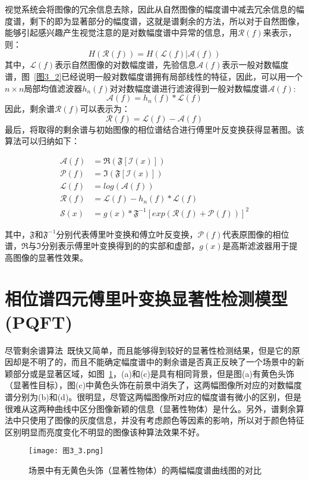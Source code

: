 视觉系统会将图像的冗余信息去除，因此从自然图像的幅度谱中减去冗余信息的幅度谱，剩下的即为显著部分的幅度谱，这就是谱剩余的方法，所以对于自然图像，能够引起感兴趣产生视觉注意的是对数幅度谱中异常的信息，用$\mathcal{R}(f)$来表示，则：
\begin{equation}
H(\mathcal{R}(f))=H(\mathcal{L}(f)|\mathcal{A}(f))
\label{式3_3}
\end{equation}
其中，$\mathcal{L}(f)$表示自然图像的对数幅度谱，先验信息$\mathcal{A}(f)$表示一般对数幅度谱，图~\ref{图3_2}已经说明一般对数幅度谱拥有局部线性的特征，因此，可以用一个$n \times n$局部均值滤波器${h}_{n}(f)$对对数幅度谱进行滤波得到一般对数幅度谱$\mathcal{A}(f)$:
\begin{equation}
\mathcal{A}(f)={h}_{n}(f)\ast \mathcal{L}(f)
\label{式3_4}
\end{equation}
因此，剩余谱$\mathcal{R}(f)$可以表示为：
\begin{equation}
\mathcal{R}(f)=\mathcal{L}(f)-\mathcal{A}(f)
\label{式3_5}
\end{equation}
最后，将取得的剩余谱与初始图像的相位谱结合进行傅里叶反变换获得显著图。该算法可以归纳如下：
\begin{linenomath}
\begin{align}
\mathcal{A}(f) &= \Re(\mathfrak{F}[\mathcal{I}(x)])\label{式3_6}\\
\mathcal{P}(f) &= \Im(\mathfrak{F}[\mathcal{I}(x)])\label{式3_7}\\
\mathcal{L}(f) &= log(\mathcal{A}(f))\label{式3_8}\\
\mathcal{R}(f) &= \mathcal{L}(f)-h_{n}(f)\ast \mathcal{L}(f) \label{式3_9}\\
\mathcal{S}(x) &= g(x)\ast \mathfrak{F}^{-1}[exp(\mathcal{R}(f)+\mathcal{P}(f))]^{2}\label{式3_10}
\end{align}
\end{linenomath}
其中，$\mathfrak{F}$和$\mathfrak{F}^{-1}$分别代表傅里叶变换和傅立叶反变换，$\mathcal{P}(f)$代表原图像的相位谱，$\Re$与$\Im$分别表示傅里叶变换得到的的实部和虚部，$g(x)$是高斯滤波器用于提高图像的显著性效果。

\section{相位谱四元傅里叶变换显著性检测模型(PQFT)}
\label{3_2}

尽管剩余谱算法~\cite{HouXiaodiCVPR2007Residual}既快又简单，而且能够得到较好的显著性检测结果，但是它的原因却是不明了的，而且不能确定幅度谱中的剩余谱是否真正反映了一个场景中的新颖部分或是显著区域，如图~\ref{图3_3}，(a)和(c)是具有相同背景，但是图(a)有黄色头饰（显著性目标），图(c)中黄色头饰在前景中消失了，这两幅图像所对应的对数幅度谱分别为(b)和(d)。很明显，尽管这两幅图像所对应的幅度谱有微小的区别，但是很难从这两种曲线中区分图像新颖的信息（显著性物体）是什么。另外，谱剩余算法中只使用了图像的灰度信息，并没有考虑颜色等因素的影响，所以对于颜色特征区别明显而亮度变化不明显的图像该种算法效果不好。
\begin{figure}[!t] %
\centering
\texttt{[image: 图3\_3.png]}
\caption{场景中有无黄色头饰（显著性物体）的两幅幅度谱曲线图的对比}
\label{图3_3}
\end{figure}

